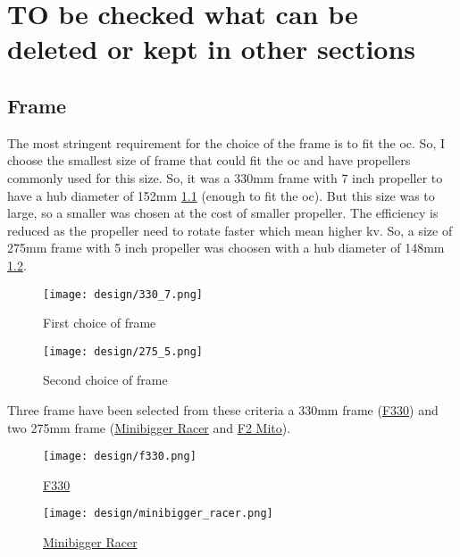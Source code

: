 \chapter{TO be checked what can be deleted or kept in other sections}
\section{Frame}


The most stringent requirement for the choice of the frame is to fit the \gls{oc}. So, I choose the smallest size of frame that could fit the \gls{oc} and have propellers commonly used for this size. So, it was a 330mm frame with 7 inch propeller to have a hub diameter of 152mm \ref{fig:330_7} (enough to fit the \gls{oc}). But this size was to large, so a smaller was chosen at the cost of smaller propeller. The efficiency  is reduced as the propeller need to rotate faster which mean higher \gls{kv}. So, a size of 275mm frame with 5 inch propeller was choosen with a hub diameter of 148mm \ref{fig:275_5.png}.

\begin{figure}[!ht]
    \centering
    \texttt{[image: design/330\_7.png]}
    \caption{First choice of frame}
    \label{fig:330_7}
\end{figure}

\begin{figure}[!ht]
    \centering
    \texttt{[image: design/275\_5.png]}
    \caption{Second choice of frame}
    \label{fig:275_5.png}
\end{figure}

Three frame have been selected from these criteria a 330mm frame (\hyperref[fig:f330]{F330}) and two 275mm frame (\hyperref[fig:minibiggerracer]{Minibigger Racer} and \hyperref[fig:f2mito]{F2 Mito}).

\begin{figure}[!ht]
    \centering
    \texttt{[image: design/f330.png]}
    \caption{\href{https://www.banggood.com/DJI-F330-4-Axis-RC-Quadcopter-Frame-Kit-Support-KK-MK-MWC-p-943370.html?rmmds=search&ID=48074&cur_warehouse=CN}{F330}}
    \label{fig:f330}
\end{figure}

\begin{figure}[!ht]
    \centering
    \texttt{[image: design/minibigger\_racer.png]}
    \caption{\href{https://www.banggood.com/Minibigger-Racer-255mm-275mm-Carbon-Fiber-4mm-Arm-RC-Drone-FPV-Racing-Frame-Kit-with-Wrench-Tools-p-1241634.html?rmmds=search&ID=228532758&cur_warehouse=CN}{Minibigger Racer}}
    \label{fig:minibiggerracer}
\end{figure}

